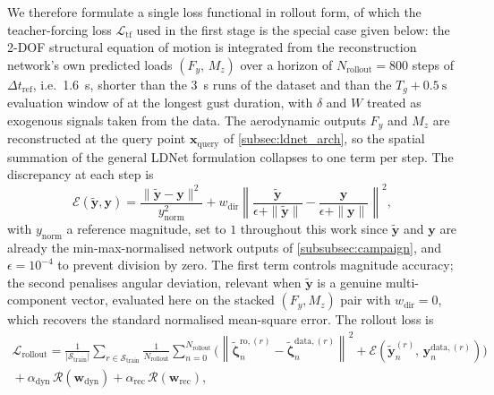We therefore formulate a single loss functional in rollout form, of which the teacher-forcing
loss $\mathcal{L}_\mathrm{tf}$ used in the first stage is the special case given below: the 2-DOF
structural equation of motion is integrated from the reconstruction network's own predicted
loads $(F_y,\,M_z)$ over a horizon of $N_\mathrm{rollout} = 800$ steps of $\Delta t_{\mathrm{ref}}$,
i.e.\ \SI{1.6}{\second}, shorter than the \SI{3}{\second} runs of the dataset and than the
$T_g+\SI{0.5}{\second}$ evaluation window of  at the longest gust duration,
with $\delta$ and $W$
treated as exogenous signals taken from the data. The aerodynamic outputs $F_y$ and $M_z$ are
reconstructed at the query point $\mathbf{x}_\mathrm{query}$ of \cref{subsec:ldnet_arch}, so the
spatial summation of the general LDNet formulation collapses to one term per step. The
discrepancy at each step is
\begin{equation}
\mathcal{E}(\tilde{\mathbf{y}}, \mathbf{y}) =
    \frac{\|\tilde{\mathbf{y}} - \mathbf{y}\|^2}{y_\mathrm{norm}^2}
    + w_\mathrm{dir}
    \left\|
        \frac{\tilde{\mathbf{y}}}{\epsilon + \|\tilde{\mathbf{y}}\|}
        - \frac{\mathbf{y}}{\epsilon + \|\mathbf{y}\|}
    \right\|^2,
\label{eq:discrepancy}
\end{equation}
with $y_\mathrm{norm}$ a reference magnitude, set to $1$ throughout this work since $\tilde{\mathbf y}$ and $\mathbf y$ are already the min-max-normalised network outputs of \cref{subsubsec:campaign}, and $\epsilon = 10^{-4}$ to prevent division
by zero. The first term controls magnitude accuracy; the second penalises angular deviation,
relevant when $\tilde{\mathbf y}$ is a genuine multi-component vector, evaluated here on the
stacked $(F_y,M_z)$ pair with $w_\mathrm{dir}=0$, which recovers the standard
normalised mean-square error. The rollout loss is
\begin{equation}
\begin{split}
\mathcal{L}_\mathrm{rollout} =
    \frac{1}{|\mathcal{S}_\mathrm{train}|}
    \sum_{r \in \mathcal{S}_\mathrm{train}}
    \frac{1}{N_\mathrm{rollout}}
    \sum_{n=0}^{N_\mathrm{rollout}}
    \bigg(
        \left\|\tilde{\boldsymbol{\zeta}}_n^{\mathrm{ro},(r)} - \tilde{\boldsymbol{\zeta}}_n^{\mathrm{data},(r)}\right\|^2
        + \mathcal{E}\!\left(\tilde{\mathbf{y}}_n^{(r)},\, \mathbf{y}_n^{\mathrm{data},(r)}\right)
    \bigg) \\
    {}+ \alpha_\mathrm{dyn}\,\mathcal{R}(\mathbf{w}_\mathrm{dyn})
    + \alpha_\mathrm{rec}\,\mathcal{R}(\mathbf{w}_\mathrm{rec}),
\end{split}
\label{eq:rollout_loss}
\end{equation}

